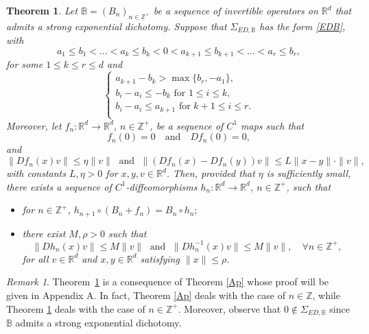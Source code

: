 \documentclass[reqno, a4paper, 10pt]{amsart}
\theoremstyle{plain}
\numberwithin{equation}{section}
\newtheorem{theorem}{Theorem}
\theoremstyle{remark}
\newtheorem{remark}{Remark}
\def\R{\mathbb{R}}
\def\Z{\mathbb{Z}}
\begin{document}
\begin{theorem}\label{t0}
Let $\mathbb B=(B_n)_{n\in \Z^+}$ be a sequence of invertible operators on $\R^d$ that admits a strong exponential dichotomy.
Suppose that $\Sigma_{ED, \mathbb B}$  has the form \eqref{EDB}, with
\begin{equation}\label{sp1}
a_1\le b_1 <\ldots <a_k\le b_k <0<a_{k+1}\le b_{k+1}<\ldots <a_r\le b_r,
\end{equation}
for some $1\leq k\leq r\leq d$ and
\begin{equation}\label{sp2}
\begin{cases}
a_{k+1}-b_k>\max \{b_r, -a_1\},\\
b_i-a_i\le -b_k \text{ for } 1\le i\le k,\\
b_i-a_i\le a_{k+1} \text{ for } k+1\le i \le r.\\
\end{cases}
\end{equation}
Moreover, let $f_n\colon \R^d \to \R^d$, $n\in \Z^+$, be a sequence of $C^1$ maps such that
\begin{equation}\label{fzero}
f_n(0)=0 \quad \text{and} \quad Df_n(0)=0,
\end{equation}
and
\begin{equation}\label{fm}
\|Df_n(x)v\| \le \eta \|v\| \; \text{ and } \; \|(Df_n(x)-Df_n(y))v\| \le L\|x-y\| \cdot \|v\|,
\end{equation}
with constants $L, \eta>0$ for $x, y, v\in \R^d$. Then, provided that $\eta$ is sufficiently small,  there exists a sequence of $C^1$-diffeomorphisms $h_n\colon \R^d\to \R^d$, $n\in \Z^+$,  such that
\begin{itemize}
\item for $n\in \Z^+$,
$
h_{n+1} \circ (B_n+f_n)=B_n\circ h_n;
$
\item there exist $M, \rho>0$ such that
\begin{equation*}
\|D h_n(x)v\|\le M\|v\| \; \text{ and }\; \|Dh_n^{-1}(x)v\| \le M\|v\|, \quad \forall n\in \Z^+,
\end{equation*}
for all $v\in \R^d$ and $x,y\in \mathbb{R}^d$ satisfying $\|x\|\le \rho$.
\end{itemize}
\end{theorem}

\begin{remark}
Theorem~\ref{t0} is a consequence of Theorem \ref{Ap} whose proof will be given in Appendix A. In fact, Theorem \ref{Ap} deals with the case of $n\in \Z$, while Theorem \ref{t0} deals with the case of $n\in \Z^+$. Moreover, observe that $0\notin \Sigma_{ED, \mathbb B}$ since $\mathbb B$ admits a strong exponential dichotomy.
\end{remark}
\end{document}
